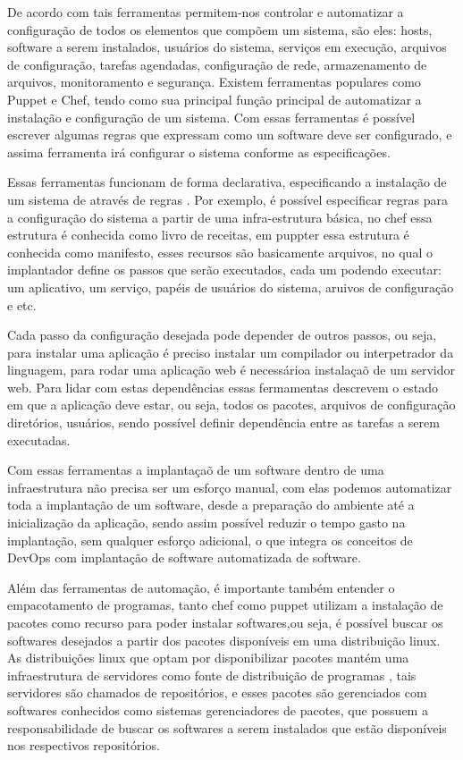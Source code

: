 De acordo com  \cite{6265084} tais ferramentas permitem-nos controlar e automatizar
a configuração de todos os elementos que compõem um sistema, são eles: hosts, software a serem instalados,
usuários do sistema, serviços em execução, arquivos de configuração, tarefas agendadas,
configuração de rede, armazenamento de arquivos, monitoramento e segurança. Existem
ferramentas populares como Puppet e Chef, tendo como sua principal função principal
de automatizar a instalação e configuração de um sistema. Com essas ferramentas é
possível escrever algumas regras que expressam como um software deve ser configurado,
e assima ferramenta irá configurar o sistema conforme as especificações.

Essas ferramentas funcionam de forma declarativa, especificando a instalação de um sistema de
através de regras \cite{6265084}. Por exemplo, é possível especificar regras para a configuração do sistema
a partir de uma infra-estrutura básica, no chef essa estrutura é conhecida como livro
de receitas, em puppter essa estrutura é conhecida como manifesto, esses recursos
são basicamente arquivos, no qual o implantador define os passos que serão executados,
cada um podendo executar: um aplicativo, um serviço, papéis de usuários do sistema,
aruivos de configuração e etc.

Cada passo da configuração desejada pode depender de outros passos, ou seja, para
instalar uma aplicação é preciso instalar um compilador ou interpetrador da linguagem,
para rodar uma aplicação web é necessárioa instalaçaõ de um servidor web. Para
lidar com estas dependências essas fermamentas descrevem o estado em que a aplicação
deve estar, ou seja, todos os pacotes, arquivos de configuração diretórios, usuários,
sendo possível definir dependência entre as tarefas a serem executadas.

Com essas ferramentas a implantaçaõ de um software dentro de uma infraestrutura
não precisa ser um esforço manual, com elas podemos automatizar toda a implantação
de um software, desde a preparação do ambiente até a inicialização da aplicação,
sendo assim possível reduzir o tempo gasto na implantação, sem qualquer esforço
adicional, o que integra os conceitos de DevOps com implantação de software automatizada
de software.

Além das ferramentas de automação, é importante também entender o empacotamento de
programas, tanto chef como puppet utilizam a instalação de pacotes como recurso para
poder instalar softwares,ou seja, é possível buscar os softwares desejados a partir
dos pacotes disponíveis em uma distribuição linux. As distribuições linux que
optam por disponibilizar pacotes mantém uma infraestrutura de servidores como fonte
de distribuição de programas \cite{araujo2011apprecommender}, tais servidores são
chamados de repositórios, e esses pacotes são gerenciados com softwares conhecidos
como sistemas gerenciadores de pacotes, que possuem a responsabilidade de buscar
os softwares a serem instalados que estão disponíveis nos respectivos repositórios.

